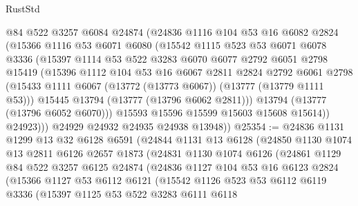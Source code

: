 \begin{lexlean}{RustStd}
\begin{coremodule}
            @84
            @522
            @3257
            @6084
            @24874
            (@24836
              @1116
              @104
              @53
              @16
              @6082
              @2824
              (@15366
                @1116
                @53
                @6071
                @6080
                (@15542
                  @1115
                  @523
                  @53
                  @6071
                  @6078
                  @3336
                  (@15397
                    @1114
                    @53
                    @522
                    @3283
                    @6070
                    @6077
                    @2792
                    @6051
                    @2798
                    @15419
                    (@15396
                      @1112
                      @104
                      @53
                      @16
                      @6067
                      @2811
                      @2824
                      @2792
                      @6061
                      @2798
                      (@15433 @1111 @6067 (@13772 (@13773 @6067)) (@13777 (@13779 @1111 @53)))
                      @15445
                      @13794
                      (@13777 (@13796 @6062 @2811)))
                    @13794
                    (@13777 (@13796 @6052 @6070)))
                  @15593
                  @15596
                  @15599
                  @15603
                  @15608
                  @15614))
              @24923)))
        @24929
        @24932
        @24935
        @24938
        @13948))
@25354 := @24836
    @1131
    @1299
    @13
    @32
    @6128
    @6591
    (@24844
      @1131
      @13
      @6128
      (@24850
        @1130
        @1074
        @13
        @2811
        @6126
        @2657
        @1873
        (@24831
          @1130
          @1074
          @6126
          (@24861
            @1129
            @84
            @522
            @3257
            @6125
            @24874
            (@24836
              @1127
              @104
              @53
              @16
              @6123
              @2824
              (@15366
                @1127
                @53
                @6112
                @6121
                (@15542
                  @1126
                  @523
                  @53
                  @6112
                  @6119
                  @3336
                  (@15397
                    @1125
                    @53
                    @522
                    @3283
                    @6111
                    @6118

\end{coremodule}
\end{lexlean}
